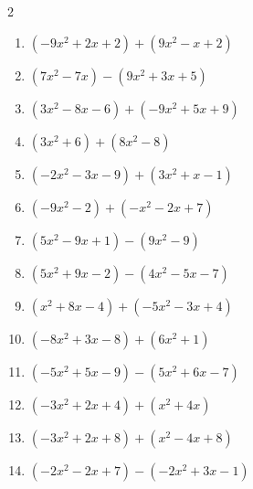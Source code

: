 \begin{multicols}{2}
\begin{enumerate}
  \item $(-9x^{2}+2x+2)+(9x^{2}-x+2)$

        \phantom{$=x+4$}

  \item $(7x^{2}-7x)-(9x^{2}+3x+5)$


  \item $(3x^{2}-8x-6)+(-9x^{2}+5x+9)$


  \item $(3x^{2}+6)+(8x^{2}-8)$


  \item $(-2x^{2}-3x-9)+(3x^{2}+x-1)$


  \item $(-9x^{2}-2)+(-x^{2}-2x+7)$


  \item $(5x^{2}-9x+1)-(9x^{2}-9)$


  \item $(5x^{2}+9x-2)-(4x^{2}-5x-7)$


  \item $(x^{2}+8x-4)+(-5x^{2}-3x+4)$


  \item $(-8x^{2}+3x-8)+(6x^{2}+1)$


  \item $(-5x^{2}+5x-9)-(5x^{2}+6x-7)$


  \item $(-3x^{2}+2x+4)+(x^{2}+4x)$


  \item $(-3x^{2}+2x+8)+(x^{2}-4x+8)$


  \item $(-2x^{2}-2x+7)-(-2x^{2}+3x-1)$


\end{enumerate}
\end{multicols}
